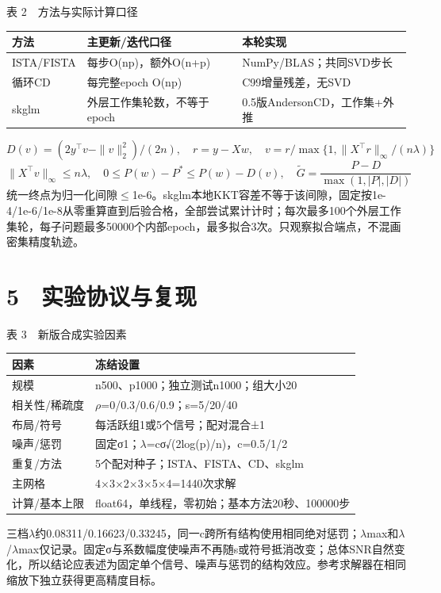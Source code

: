 \documentclass[UTF8,fontset=fandol,10pt]{ctexart}
\begin{document}
\begin{center}{\small 表 2　方法与实际计算口径}\\\small\begin{tabularx}{\linewidth}{lXX}
\toprule
方法 & 主更新/迭代口径 & 本轮实现 \\ \midrule
ISTA/FISTA & 每步O(np)，额外O(n+p) & NumPy/BLAS；共同SVD步长 \\
循环CD & 每完整epoch O(np) & C99增量残差，无SVD \\
skglm & 外层工作集轮数，不等于epoch & 0.5版AndersonCD，工作集+外推 \\
\bottomrule\end{tabularx}\end{center}
\begin{equation}D(v)=(2y^\top v-\|v\|_2^2)/(2n),\quad r=y-Xw,\quad v=r/\max\{1,\|X^\top r\|_\infty/(n\lambda)\}\end{equation}
\begin{equation}\|X^\top v\|_\infty\leq n\lambda,\quad0\leq P(w)-P^*\leq P(w)-D(v),\quad \widetilde G=\frac{P-D}{\max(1,|P|,|D|)}\end{equation}
统一终点为归一化间隙\ensuremath{\leq}1e-6。skglm本地KKT容差不等于该间隙，固定按1e-4/1e-6/1e-8从零重算直到后验合格，全部尝试累计计时；每次最多100个外层工作集轮，每子问题最多50000个内部epoch，最多拟合3次。只观察拟合端点，不混画密集精度轨迹。

\clearpage
\section*{5　实验协议与复现}
\begin{center}{\small 表 3　新版合成实验因素}\\\small\begin{tabularx}{\linewidth}{lX}
\toprule
因素 & 冻结设置 \\ \midrule
规模 & n500、p1000；独立测试n1000；组大小20 \\
相关性/稀疏度 & \ensuremath{\rho}=0/0.3/0.6/0.9；s=5/20/40 \\
布局/符号 & 每活跃组1或5个信号；配对混合±1 \\
噪声/惩罚 & 固定σ1；\ensuremath{\lambda}=cσ√(2log(p)/n)，c=0.5/1/2 \\
重复/方法 & 5个配对种子；ISTA、FISTA、CD、skglm \\
主网格 & 4\ensuremath{\times}3\ensuremath{\times}2\ensuremath{\times}3\ensuremath{\times}5\ensuremath{\times}4=1440次求解 \\
计算/基本上限 & float64，单线程，零初始；基本方法20秒、100000步 \\
\bottomrule\end{tabularx}\end{center}
三档\ensuremath{\lambda}约0.08311/0.16623/0.33245，同一c跨所有结构使用相同绝对惩罚；\ensuremath{\lambda}max和\ensuremath{\lambda}/\ensuremath{\lambda}max仅记录。固定σ与系数幅度使噪声不再随s或符号抵消改变；总体SNR自然变化，所以结论应表述为固定单个信号、噪声与惩罚的结构效应。参考求解器在相同缩放下独立获得更高精度目标。
\end{document}
